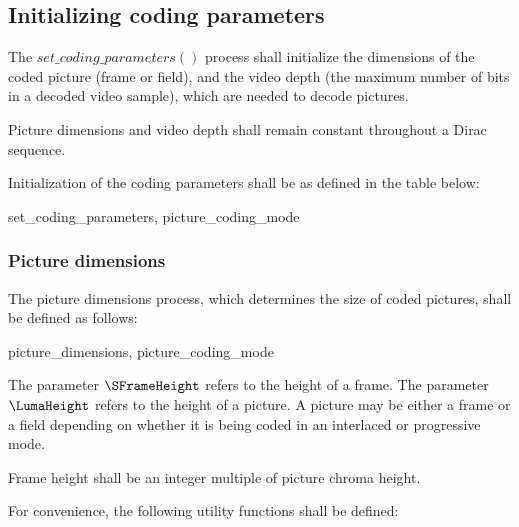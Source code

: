 \subsection{Initializing coding parameters}
\label{codingparameters}

The $set\_coding\_parameters()$ process shall initialize the dimensions of the coded picture (frame or field), and the video depth (the maximum number of bits in a decoded video sample), which are needed to decode pictures. 

Picture dimensions and video depth shall remain constant throughout a Dirac sequence. 

Initialization of the coding parameters shall be as defined in the table below:

\begin{pseudo}{set\_coding\_parameters}{\VideoParams, picture\_coding\_mode}
\end{pseudo}

\subsubsection{Picture dimensions}
\label{picturedimensions}
The picture dimensions process, which determines the size of coded pictures, shall be defined as follows:

\begin{pseudo}{picture\_dimensions}{\VideoParams, picture\_coding\_mode}
\bsCODE{\LumaWidth = \SFrameWidth}
\bsCODE{\LumaHeight = \SFrameHeight}
\bsCODE{\ChromaWidth = \LumaWidth}
\bsCODE{\ChromaHeight = \LumaHeight}
\bsCODE{chroma\_format\_index = \SChromaFormatIndex]}
\bsEND
{}
\bsEND
\end{pseudo}

The parameter $\SFrameHeight$  refers to the height of a frame. The parameter $\LumaHeight$ refers to the height of a picture.  A picture may be either a frame or a field depending on whether it is being coded in an interlaced or progressive mode.

Frame height shall be an integer multiple of picture chroma height.

For convenience, the following utility functions shall be defined:

